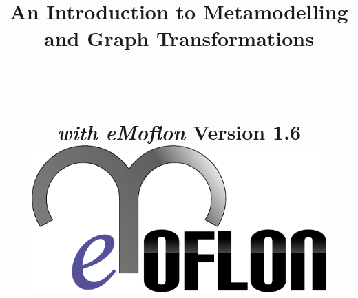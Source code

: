 \title{
\flushright
{\LARGE\bfseries An Introduction to Metamodelling\\
and Graph Transformations}
\noindent\rule[-1ex]{\textwidth}{5pt}\\[2.5ex]
\hfill\emph{\LARGE\bfseries with eMoflon}
\flushleft
{\small Version 1.6}
\flushright
\includegraphics[width=0.85\textwidth]{pics/eMoflon3} 
}

\date{}  
\author{} 